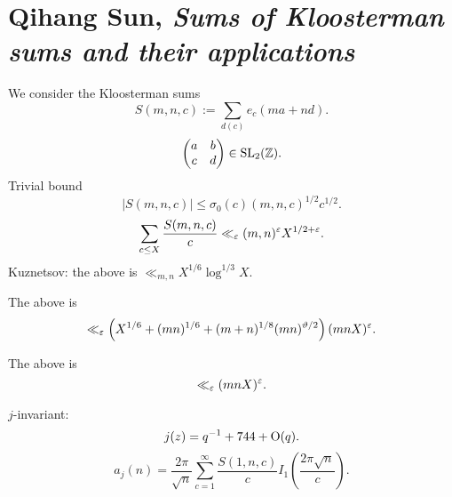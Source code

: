 \documentclass[reqno]{amsart} 
\begin{document}
\section{Qihang Sun, \emph{Sums of Kloosterman sums and their applications}}
We consider the Kloosterman sums
\begin{equation*}
S (m, n, c ) := \sum_{d (c)} e_c (m a + n d).
\end{equation*}
\begin{equation*}
\begin{pmatrix}
a & b \\
c & d \\
\end{pmatrix} \in \operatorname{SL}_2(\mathbb{Z}).
\end{equation*}
Trivial bound
\begin{equation*}
  \left\lvert S (m, n, c) \right\rvert \leq \sigma_0 (c)
  (m, n, c)^{1/2} c^{1/2}.
\end{equation*}
\begin{equation*}
  \sum_{c \leq X}
  \frac{S (m, n, c)}{c}
  \ll_\varepsilon (m, n )^\varepsilon X^{1/2 + \varepsilon }.
\end{equation*}
Kuznetsov: the above is $\ll_{m, n} X^{1/6} \log^{1/3} X$.

\begin{theorem}
The above is
\begin{equation*}
  \ll_\varepsilon \left( X^{1/6} + (m n )^{1/6}
    + (m + n )^{1/8}
    (m n )^{\vartheta  / 2}
  \right)
  (m n X)^\varepsilon.  
\end{equation*}
\end{theorem}

\begin{conjecture}
  The above is
  \begin{equation*}
\ll_\varepsilon (m n X)^\varepsilon .
\end{equation*}
\end{conjecture}

$j$-invariant:
\begin{equation*}
j (z ) = q^{-1} + 744 + \operatorname{O}(q).
\end{equation*}
\begin{equation*}
  a_j (n ) = \frac{2 \pi }{ \sqrt{n}} \sum_{c = 1 }^\infty \frac{S (1, n, c)}{c} I_1 \left( \frac{2 \pi \sqrt{n}}{c} \right).
\end{equation*}
\end{document}
